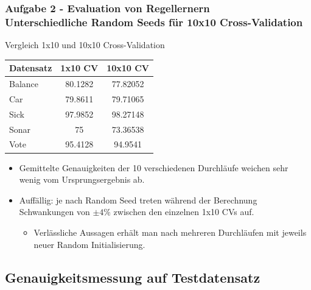 \documentclass[accentcolor=tud6b,colorbacktitle,inverttitle,landscape,german,presentation,t]{tudbeamer}
\begin{document}
    \begin{frame}[t]
    \frametitle{Aufgabe 2 - Evaluation von Regellernern\\ Unterschiedliche Random Seeds für 10x10 Cross-Validation}
        \vfill
        Vergleich 1x10 und 10x10 Cross-Validation
        \vfill
        \begin{tabular}[htbp]{l||c|c}
            Datensatz & 1x10 CV & 10x10 CV \\
            \hline
            \hline
            Balance & 80.1282 & 77.82052 \\
            \hline
            Car & 79.8611 & 79.71065 \\
            \hline
            Sick & 97.9852 & 98.27148 \\
            \hline
            Sonar & 75 & 73.36538 \\
            \hline
            Vote & 95.4128 & 94.9541 \\
        \end{tabular}
        \vfill
         \begin{itemize}
            \item Gemittelte Genauigkeiten der 10 verschiedenen Durchläufe weichen sehr wenig vom Ursprungsergebnis ab.
            \item Auffällig: je nach Random Seed treten während der Berechnung Schwankungen von $\pm 4\%$ zwischen den einzelnen 1x10 CVs auf.
         \begin{itemize}
         		\item  Verlässliche Aussagen erhält man nach mehreren Durchläufen mit jeweils neuer Random Initialisierung.
	 \end{itemize} 
        \end{itemize}        
    \end{frame}
    
    \subsection{Genauigkeitsmessung auf Testdatensatz}
    
\end{document}
